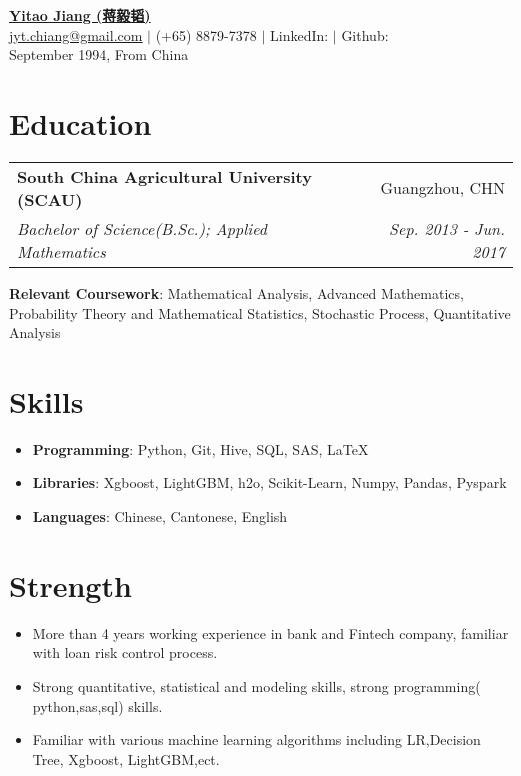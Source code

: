 \documentclass[letterpaper,10pt]{article}
\makeatletter
\newcommand{\resumeItemNoBullet}[2]{
  \item[]\small{
    \hspace{-9pt}\textbf{#1}{: #2 \vspace{-6pt}}
  }
}
\newcommand{\resumeSubheading}[4]{
  \vspace{-1pt}\item[]
  \begin{tabular*}{0.98\textwidth}{l@{\extracolsep{\fill}}r}
      \hspace{-10pt}\textbf{#1} & #2 \\
      \hspace{-10pt}\textit{\small#3} & \textit{\small #4} \\
    \end{tabular*}\vspace{-5pt}
}
\newcommand{\resumeSubHeadingListStart}{\begin{itemize}[leftmargin=*]}
\newcommand{\resumeSubHeadingListEnd}{\end{itemize}}
\newcommand{\shorterSection}[1]{\vspace{-10pt}\section{#1}}
\makeatother
\begin{document}
\begin{CJK*}{UTF8}{gkai}

\fancyfoot[C]{} 

\begin{center}
  \small \textbf{\href{chiang233.github.io}{\huge Yitao Jiang (蒋毅韬)}} \\  \href{mailto:jyt.chiang@gmail.com}{\color{blue}\underline{jyt.chiang@gmail.com}} $\vert$
  (+65) 8879-7378 $\vert$
  LinkedIn: \href{https://www.linkedin.com/in/chiang1049/}{\color{blue}\underline{\faLinkedin}} $\vert$
  Github: \href{https://github.com/chiang233}{\color{blue}\underline{\faGithub}} \\
    
  \small September 1994, From China
\end{center}

\hspace*{\fill} 

\shorterSection{Education}
  \resumeSubHeadingListStart
    \resumeSubheading
      {South China Agricultural University (SCAU)}{Guangzhou, CHN}
      {Bachelor of Science(B.Sc.);  Applied Mathematics}{Sep. 2013 - Jun. 2017}{
      \resumeItemNoBullet{Relevant Coursework}{Mathematical Analysis, Advanced Mathematics, Probability Theory and Mathematical Statistics, Stochastic Process, Quantitative Analysis}
    }

  \resumeSubHeadingListEnd
  \hspace*{\fill} 

\shorterSection{Skills}
  \resumeSubHeadingListStart
  \small
    \item{
     \textbf{Programming}{: Python, Git, Hive, SQL, SAS, LaTeX}
    }
    \vspace{-5pt}
    \item{
     \textbf{Libraries}{: Xgboost, LightGBM, h2o, Scikit-Learn, Numpy, Pandas, Pyspark}
    }
    \vspace{-5pt}
    \item{
     \textbf{Languages}{: Chinese, Cantonese, English}
    }
\resumeSubHeadingListEnd
  \hspace*{\fill} 

\shorterSection{Strength}
  \resumeSubHeadingListStart
  \small
    \item{
     \textbf{}{More than 4 years working experience in bank and Fintech company, familiar with loan risk control process.}
    }
    \vspace{-5pt}
    \item{
     \textbf{}{Strong quantitative, statistical and modeling skills, strong programming( python,sas,sql) skills.}
    }
    \vspace{-5pt}
    \item{
     \textbf{}{Familiar with various machine learning algorithms including LR,Decision Tree, Xgboost, LightGBM,ect.}
    }
\resumeSubHeadingListEnd
  \hspace*{\fill} 


\end{CJK*}
\end{document}
